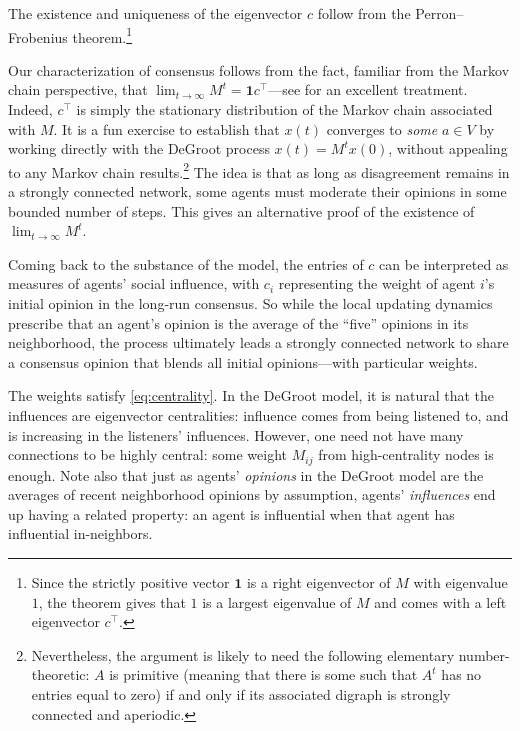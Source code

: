 \documentclass{notices}
\theoremstyle{definition}\newtheorem{problem}{Problem}
\begin{document}
The existence and uniqueness of the eigenvector $c$ follow from the Perron--Frobenius theorem.\footnote{Since the strictly positive vector $\bm{1}$ is a right eigenvector of $M$ with eigenvalue $1$, the theorem gives that $1$ is a largest eigenvalue of $M$ and comes with a left eigenvector $c^\top$.} 

Our characterization of consensus follows from the fact, familiar from the Markov chain perspective, that $\lim_{t \to \infty} M^t = \mathbf{1}  c^\top$---see \cite[Ch. 8]{meyer-book} for an excellent treatment. Indeed, $c^\top$ is simply the stationary distribution of the Markov chain associated with $M$. It is a fun exercise to establish that $x(t)$ converges to \emph{some} $a \in V$ by working directly with the DeGroot process $x(t) = M^t x(0)$, without appealing to any Markov chain results.\footnote{Nevertheless, the argument is likely to need the following elementary number-theoretic: $A$ is primitive (meaning that there is some such that $A^t$ has no entries equal to zero) if and only if its associated digraph is strongly connected and aperiodic.} The idea is that as long as disagreement remains in a strongly connected network, some agents must moderate their opinions in some bounded number of steps. This gives an alternative proof of the existence of  $\lim_{t\to \infty} M^t$.

Coming back to the substance of the model, the entries of $c$ can be interpreted as measures of agents' social influence, with $c_i$ representing the weight of agent $i$'s initial opinion in the long-run consensus. So while the local updating dynamics prescribe that an agent's opinion is the average of the ``five'' opinions in its neighborhood,  the process ultimately leads a strongly connected network to share a consensus opinion that blends all initial opinions---with particular weights.

The weights satisfy \cref{eq:centrality}. In the DeGroot model, it is natural that the influences are eigenvector centralities: influence comes from being listened to, and is increasing in the listeners' influences. However, one need not have many  connections to be highly central: some weight $M_{ij}$ from high-centrality nodes is enough. Note also that just as agents' \emph{opinions} in the DeGroot model are the averages of recent neighborhood opinions by assumption, agents' \emph{influences} end up having a related property: an agent is influential when that agent has influential in-neighbors. 
\end{document}

